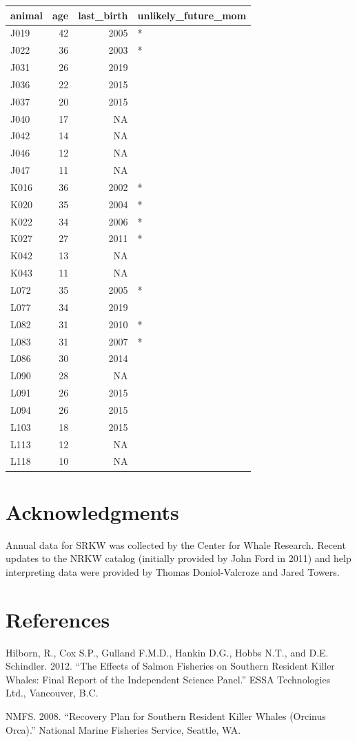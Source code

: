\documentclass[]{article}
\begin{document}
\begin{longtable}[]{@{}lrrl@{}}
\toprule
animal & age & last\_birth & unlikely\_future\_mom\tabularnewline
\midrule
\endhead
J019 & 42 & 2005 & *\tabularnewline
J022 & 36 & 2003 & *\tabularnewline
J031 & 26 & 2019 &\tabularnewline
J036 & 22 & 2015 &\tabularnewline
J037 & 20 & 2015 &\tabularnewline
J040 & 17 & NA &\tabularnewline
J042 & 14 & NA &\tabularnewline
J046 & 12 & NA &\tabularnewline
J047 & 11 & NA &\tabularnewline
K016 & 36 & 2002 & *\tabularnewline
K020 & 35 & 2004 & *\tabularnewline
K022 & 34 & 2006 & *\tabularnewline
K027 & 27 & 2011 & *\tabularnewline
K042 & 13 & NA &\tabularnewline
K043 & 11 & NA &\tabularnewline
L072 & 35 & 2005 & *\tabularnewline
L077 & 34 & 2019 &\tabularnewline
L082 & 31 & 2010 & *\tabularnewline
L083 & 31 & 2007 & *\tabularnewline
L086 & 30 & 2014 &\tabularnewline
L090 & 28 & NA &\tabularnewline
L091 & 26 & 2015 &\tabularnewline
L094 & 26 & 2015 &\tabularnewline
L103 & 18 & 2015 &\tabularnewline
L113 & 12 & NA &\tabularnewline
L118 & 10 & NA &\tabularnewline
\bottomrule
\end{longtable}

\break

\hypertarget{acknowledgments}{%
\section{Acknowledgments}\label{acknowledgments}}

Annual data for SRKW was collected by the Center for Whale Research.
Recent updates to the NRKW catalog (initially provided by John Ford in
2011) and help interpreting data were provided by Thomas Doniol-Valcroze
and Jared Towers.

\hypertarget{references}{%
\section*{References}\label{references}}

\hypertarget{refs}{}
\leavevmode\hypertarget{ref-hilborn2012}{}%
Hilborn, R., Cox S.P., Gulland F.M.D., Hankin D.G., Hobbs N.T., and D.E.
Schindler. 2012. ``The Effects of Salmon Fisheries on Southern Resident
Killer Whales: Final Report of the Independent Science Panel.'' ESSA
Technologies Ltd., Vancouver, B.C.

\leavevmode\hypertarget{ref-nmfs2008}{}%
NMFS. 2008. ``Recovery Plan for Southern Resident Killer Whales (Orcinus
Orca).'' National Marine Fisheries Service, Seattle, WA.
\end{document}
